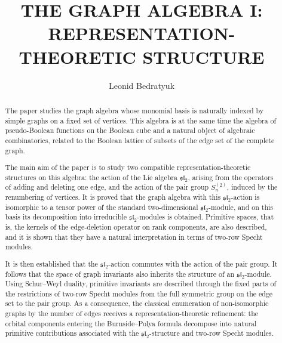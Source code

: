 \documentclass[12pt,reqno]{amsart}
\begin{document}
 \title{ \MakeUppercase{  The Graph Algebra  I: Representation-Theoretic Structure
}} 

\author{Leonid Bedratyuk}
\address{ Khmelnytsky National University, Faculty of Information Technology, Ukraine}

\begin{abstract}
The paper studies the graph algebra whose monomial basis is naturally
indexed by simple graphs on a fixed set of vertices. This algebra is at the
same time the algebra of pseudo-Boolean functions on the Boolean cube and a
natural object of algebraic combinatorics, related to the Boolean lattice of
subsets of the edge set of the complete graph.

The main aim of the paper is to study two compatible representation-theoretic
structures on this algebra: the action of the Lie algebra $\mathfrak{sl}_2$,
arising from the operators of adding and deleting one edge, and the action of
the pair group $S_n^{(2)}$, induced by the renumbering of vertices. It is
proved that the graph algebra with this $\mathfrak{sl}_2$-action is
isomorphic to a tensor power of the standard two-dimensional
$\mathfrak{sl}_2$-module, and on this basis its decomposition into
irreducible $\mathfrak{sl}_2$-modules is obtained. Primitive spaces, that is,
the kernels of the edge-deletion operator on rank components, are also
described, and it is shown that they have a natural interpretation in terms
of two-row Specht modules.

It is then established that the $\mathfrak{sl}_2$-action commutes with the
action of the pair group. It follows that the space of graph invariants also
inherits the structure of an $\mathfrak{sl}_2$-module. Using Schur--Weyl
duality, primitive invariants are described through the fixed parts of the
restrictions of two-row Specht modules from the full symmetric group on the
edge set to the pair group. As a consequence, the classical enumeration of
non-isomorphic graphs by the number of edges receives a representation-theoretic
refinement: the orbital components entering the Burnside--Polya formula
decompose into natural primitive contributions associated with the
$\mathfrak{sl}_2$-structure and two-row Specht modules.

\end{abstract}



\maketitle 
\end{document}
